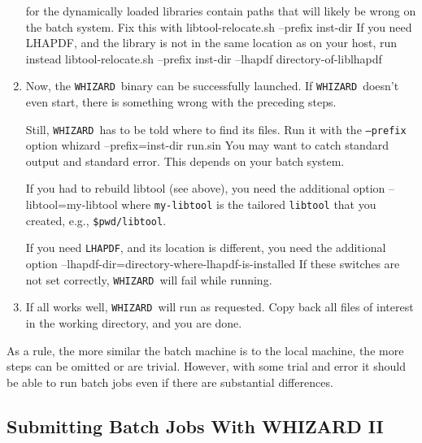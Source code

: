 \documentclass[12pt]{book}
\newenvironment{interaction}%
  {\begingroup\small
   \verbatim}%
  {\endverbatim
   \endgroup\noindent}
\newcommand{\ttt}[1]{\texttt{#1}}
\newcommand{\whizard}{\texttt{WHIZARD}}
\newcommand{\lhapdf}{\texttt{LHAPDF}}
\begin{document}
\begin{enumerate}
  for the dynamically loaded libraries contain paths that will likely
  be wrong on the batch system.  Fix this with
  \begin{interaction}
    libtool-relocate.sh --prefix inst-dir
  \end{interaction}
  If you need LHAPDF, and the library is not in the same location as
  on your host, run instead
  \begin{interaction}
    libtool-relocate.sh --prefix inst-dir --lhapdf directory-of-liblhapdf
  \end{interaction}
\item
  Now, the \whizard\ binary can be successfully launched.  If
  \whizard\ doesn't even start, there is something wrong with the preceding
  steps.  

  Still, \whizard\ has to be told where to find its files.  Run it
  with the \ttt{--prefix} option
  \begin{interaction}
    whizard --prefix=inst-dir run.sin
  \end{interaction}
  You may want to catch standard output and standard error.  This
  depends on your batch system.

  If you had to rebuild libtool (see above), you need the additional option
  \begin{interaction}
    --libtool=my-libtool
  \end{interaction}
  where \ttt{my-libtool} is the tailored \ttt{libtool} that you
  created, e.g., \ttt{\$pwd/libtool}.

  If you need \lhapdf, and its location is different, you need the
  additional option
  \begin{interaction}
    --lhapdf-dir=directory-where-lhapdf-is-installed
  \end{interaction}
  If these switches are not set correctly, \whizard\ will fail while
  running. 
\item
  If all works well, \whizard\ will run as requested.  Copy back all
  files of interest in the working directory, and you are done.
\end{enumerate}  
As a rule, the more similar the batch machine is to the local machine,
the more steps can be omitted or are trivial.  However, with some
trial and error it should be able to run batch jobs even if there are
substantial differences.



\subsection{Submitting Batch Jobs With WHIZARD II}
\end{document}
